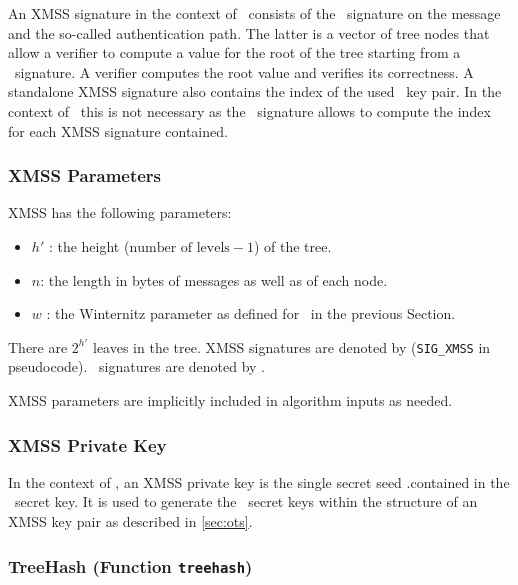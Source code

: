 An XMSS signature in the context of \SPHINCSA\ consists of the \WOTSCS\ signature on the message and the so-called authentication path. The latter is a vector of tree nodes that allow a verifier to compute a value for the root of the tree starting from a \WOTSCS\ signature. A verifier computes the root value and verifies its correctness. A standalone XMSS signature also contains the index of the used \WOTSCS\ key pair. In the context of \SPHINCSA\ this is not necessary as the \SPHINCSA\ signature allows to compute the index for each XMSS signature contained.

\subsubsection{XMSS Parameters}
\label{sec:xmsspara}
XMSS has the following parameters:

\begin{itemize}
    \item $h'$ : the height ($\text{number of levels} - 1$) of the tree.

    \item $n$: the length in bytes of messages as well as of each node.

    \item $w$ : the Winternitz parameter as defined for \WOTSCS\ in the previous Section.
\end{itemize}

There are $2^{h'}$ leaves in the tree. XMSS signatures are denoted by \sigxmss  (\texttt{SIG\_XMSS} in pseudocode). \WOTSCS\ signatures are denoted by \sig.

XMSS parameters are implicitly included in algorithm inputs as needed.

\subsubsection{XMSS Private Key}

In the context of \SPHINCSA, an XMSS private key is the single secret seed \sk.\seed contained in the \SPHINCSA\ secret key. It is used to generate the \WOTSCS\ secret keys within the structure of an XMSS key pair as described in \cref{sec:ots}.

\subsubsection{TreeHash (Function \texttt{treehash})}

